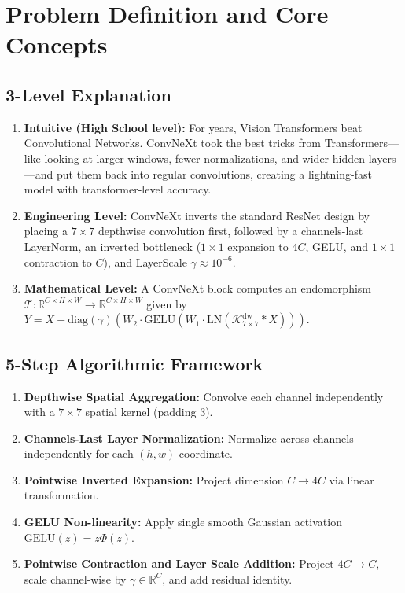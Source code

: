 \documentclass[11pt,a4paper]{article}
\theoremstyle{definition}
\begin{document}
\section{Problem Definition and Core Concepts}

\subsection{3-Level Explanation}
\begin{enumerate}
    \item \textbf{Intuitive (High School level):} For years, Vision Transformers beat Convolutional Networks. ConvNeXt took the best tricks from Transformers—like looking at larger windows, fewer normalizations, and wider hidden layers—and put them back into regular convolutions, creating a lightning-fast model with transformer-level accuracy.
    \item \textbf{Engineering Level:} ConvNeXt inverts the standard ResNet design by placing a $7 \times 7$ depthwise convolution first, followed by a channels-last LayerNorm, an inverted bottleneck ($1 \times 1$ expansion to $4C$, GELU, and $1 \times 1$ contraction to $C$), and LayerScale $\gamma \approx 10^{-6}$.
    \item \textbf{Mathematical Level:} A ConvNeXt block computes an endomorphism $\mathcal{T}: \mathbb{R}^{C \times H \times W} \to \mathbb{R}^{C \times H \times W}$ given by $Y = X + \text{diag}(\gamma) \left( W_2 \cdot \text{GELU}\left( W_1 \cdot \text{LN}(\mathcal{K}_{7\times 7}^{\text{dw}} * X) \right) \right)$.
\end{enumerate}

\subsection{5-Step Algorithmic Framework}
\begin{enumerate}
    \item \textbf{Depthwise Spatial Aggregation:} Convolve each channel independently with a $7 \times 7$ spatial kernel (padding 3).
    \item \textbf{Channels-Last Layer Normalization:} Normalize across channels independently for each $(h, w)$ coordinate.
    \item \textbf{Pointwise Inverted Expansion:} Project dimension $C \to 4C$ via linear transformation.
    \item \textbf{GELU Non-linearity:} Apply single smooth Gaussian activation $\text{GELU}(z) = z \Phi(z)$.
    \item \textbf{Pointwise Contraction and Layer Scale Addition:} Project $4C \to C$, scale channel-wise by $\gamma \in \mathbb{R}^C$, and add residual identity.
\end{enumerate}
\end{document}
